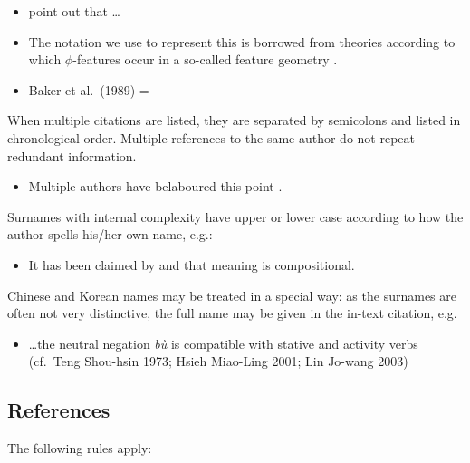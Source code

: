 \documentclass[cm,linguex]{glossa}
\providecommand{\tightlist}{%
  \setlength{\itemsep}{0pt}\setlength{\parskip}{0pt}}
\begin{document}
\begin{itemize}
\item
  \citet[514]{murray:1983} point out that \ldots{}
\item
  The notation we use to represent this is borrowed from theories
  according to which \(\phi\)-features occur in a so-called feature
  geometry \citep[ 248-250]{mccarthy:1999}.
\item
  Baker et al.~(1989) = \citet{baker:1989}
\end{itemize}

When multiple citations are listed, they are separated by semicolons and
listed in chronological order. Multiple references to the same author do
not repeat redundant information.

\begin{itemize}
\tightlist
\item
  Multiple authors have belaboured this point
  \citep{chomsky:1981, chomsky:1986a, chomsky:1986, iverson:1989, casali:1998a, blevins:2004, franks:2005}.
\end{itemize}

Surnames with internal complexity have upper or lower case according to
how the author spells his/her own name, e.g.:

\begin{itemize}
\tightlist
\item
  It has been claimed by \citet{swart:1998} and \citet{belder:2011} that
  meaning is compositional.
\end{itemize}

Chinese and Korean names may be treated in a special way: as the
surnames are often not very distinctive, the full name may be given in
the in-text citation, e.g.

\begin{itemize}
\tightlist
\item
  \ldots the neutral negation \emph{bù} is compatible with stative and
  activity verbs (cf.~Teng Shou-hsin 1973; Hsieh Miao-Ling 2001; Lin
  Jo-wang 2003)
\end{itemize}

\hypertarget{sec:refs}{%
\subsection{References}\label{sec:refs}}

The following rules apply:
\end{document}
